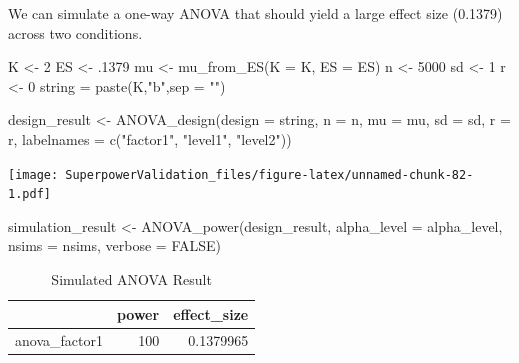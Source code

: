 \documentclass[
]{book}
\newenvironment{Shaded}{\begin{snugshade}}{\end{snugshade}}
\newcommand{\AttributeTok}[1]{\textcolor[rgb]{0.77,0.63,0.00}{#1}}
\newcommand{\ConstantTok}[1]{\textcolor[rgb]{0.00,0.00,0.00}{#1}}
\newcommand{\DecValTok}[1]{\textcolor[rgb]{0.00,0.00,0.81}{#1}}
\newcommand{\FunctionTok}[1]{\textcolor[rgb]{0.00,0.00,0.00}{#1}}
\newcommand{\NormalTok}[1]{#1}
\newcommand{\OtherTok}[1]{\textcolor[rgb]{0.56,0.35,0.01}{#1}}
\newcommand{\StringTok}[1]{\textcolor[rgb]{0.31,0.60,0.02}{#1}}
\begin{document}
We can simulate a one-way ANOVA that should yield a large effect size (0.1379) across two conditions.

\begin{Shaded}
\begin{Highlighting}[]
\NormalTok{K }\OtherTok{\textless{}{-}} \DecValTok{2}
\NormalTok{ES }\OtherTok{\textless{}{-}}\NormalTok{ .}\DecValTok{1379}
\NormalTok{mu }\OtherTok{\textless{}{-}} \FunctionTok{mu\_from\_ES}\NormalTok{(}\AttributeTok{K =}\NormalTok{ K, }\AttributeTok{ES =}\NormalTok{ ES)}
\NormalTok{n }\OtherTok{\textless{}{-}} \DecValTok{5000}
\NormalTok{sd }\OtherTok{\textless{}{-}} \DecValTok{1}
\NormalTok{r }\OtherTok{\textless{}{-}} \DecValTok{0}
\NormalTok{string }\OtherTok{=} \FunctionTok{paste}\NormalTok{(K,}\StringTok{"b"}\NormalTok{,}\AttributeTok{sep =} \StringTok{""}\NormalTok{)}
\end{Highlighting}
\end{Shaded}

\begin{Shaded}
\begin{Highlighting}[]
\NormalTok{design\_result }\OtherTok{\textless{}{-}} \FunctionTok{ANOVA\_design}\NormalTok{(}\AttributeTok{design =}\NormalTok{ string,}
                   \AttributeTok{n =}\NormalTok{ n,}
                   \AttributeTok{mu =}\NormalTok{ mu,}
                   \AttributeTok{sd =}\NormalTok{ sd,}
                   \AttributeTok{r =}\NormalTok{ r,}
                   \AttributeTok{labelnames =} \FunctionTok{c}\NormalTok{(}\StringTok{"factor1"}\NormalTok{, }\StringTok{"level1"}\NormalTok{, }\StringTok{"level2"}\NormalTok{))}
\end{Highlighting}
\end{Shaded}

\texttt{[image: SuperpowerValidation\_files/figure-latex/unnamed-chunk-82-1.pdf]}

\begin{Shaded}
\begin{Highlighting}[]
\NormalTok{simulation\_result }\OtherTok{\textless{}{-}} \FunctionTok{ANOVA\_power}\NormalTok{(design\_result,}
                                 \AttributeTok{alpha\_level =}\NormalTok{ alpha\_level,}
                                 \AttributeTok{nsims =}\NormalTok{ nsims,}
                                 \AttributeTok{verbose =} \ConstantTok{FALSE}\NormalTok{)}
\end{Highlighting}
\end{Shaded}

\begin{table}[!h]

\caption{\label{tab:unnamed-chunk-84}Simulated ANOVA Result}
\centering
\begin{tabular}[t]{l|r|r}
\hline
  & power & effect\_size\\
\hline
anova\_factor1 & 100 & 0.1379965\\
\hline
\end{tabular}
\end{table}
\end{document}
